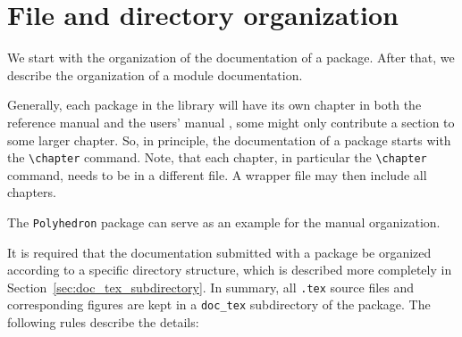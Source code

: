 \section{File and directory organization\label{sec:files_required}}

We start with the organization of the documentation of a package.
After that, we describe the organization of a module documentation.

Generally, each package in the library will have its own chapter in
both the reference manual and the users' manual%
%
, some might only contribute a
section to some larger chapter. So, in principle, the documentation of
a package starts with the \verb|\chapter| command. Note, that each
chapter, in particular the \verb|\chapter| command, needs to be in a
different file. A wrapper file may then include all chapters.

The \texttt{Polyhedron} package can serve as an example for the manual
organization.

It is required that the documentation submitted with a package be organized
according to a specific directory structure, which is described more
completely in Section~\ref{sec:doc_tex_subdirectory}. In summary, all
{\tt .tex} source files and corresponding figures are kept in a
\texttt{doc\_tex} subdirectory of the package. The following rules
describe the details:


